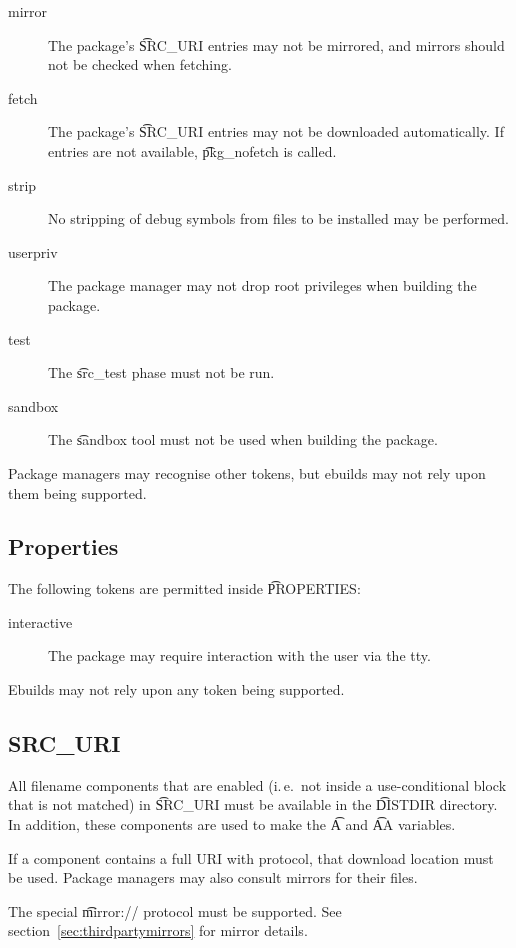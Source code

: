 \begin{description}
\item[mirror] The package's \t{SRC\_URI} entries may not be mirrored, and mirrors should not
    be checked when fetching.
\item[fetch] The package's \t{SRC\_URI} entries may not be downloaded automatically. If
    entries are not available, \t{pkg\_nofetch} is called.
\item[strip] No stripping of debug symbols from files to be installed may be performed.
\item[userpriv] The package manager may not drop root privileges when building the package.
\item[test] The \t{src\_test} phase must not be run.
\item[sandbox] The \t{sandbox} tool must not be used when building the package.
\end{description}

Package managers may recognise other tokens, but ebuilds may not rely upon them being supported.

\subsection{Properties}
\label{sec:properties}

The following tokens are permitted inside \t{PROPERTIES}:

\begin{description}
\item[interactive] The package may require interaction with the user via the tty.
\end{description}

Ebuilds may not rely upon any token being supported.

\subsection{SRC\_URI}
\label{sec:src-uri-behaviour}

All filename components that are enabled (i.\,e.\ not inside a use-conditional block that is not
matched) in \t{SRC\_URI} must be available in the \t{DISTDIR} directory. In addition, these
components are used to make the \t{A} and \t{AA} variables.

If a component contains a full URI with protocol, that download location must be used. Package
managers may also consult mirrors for their files.

The special \t{mirror://} protocol must be supported. See section~\ref{sec:thirdpartymirrors} for mirror
details.


